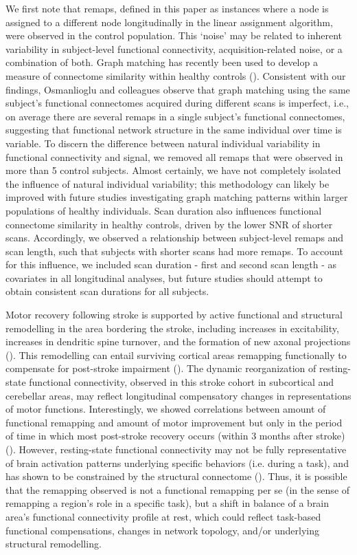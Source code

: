 \documentclass[phd,tocprelim]{cornell}
\begin{document}
	We first note that remaps, defined in this paper as instances where a node is assigned to a different node longitudinally in the linear assignment algorithm, were observed in the control population. This ‘noise’ may be related to inherent variability in subject-level functional connectivity, acquisition-related noise, or a combination of both. Graph matching has recently been used to develop a measure of connectome similarity within healthy controls (\cite{Osmanlioglu2020-xz}). Consistent with our findings, Osmanlioglu and colleagues observe that graph matching using the same subject’s functional connectomes acquired during different scans is imperfect, i.e., on average there are several remaps in a single subject’s functional connectomes, suggesting that functional network structure in the same individual over time is variable. To discern the difference between natural individual variability in functional connectivity and signal, we removed all remaps that were observed in more than 5 control subjects. Almost certainly, we have not completely isolated the influence of natural individual variability; this methodology can likely be improved with future studies investigating graph matching patterns within larger populations of healthy individuals. Scan duration also influences functional connectome similarity in healthy controls, driven by the lower SNR of shorter scans. Accordingly, we observed a relationship between subject-level remaps and scan length, such that subjects with shorter scans had more remaps. To account for this influence, we included scan duration - first and second scan length - as covariates in all longitudinal analyses, but future studies should attempt to obtain consistent scan durations for all subjects.
	
    Motor recovery following stroke is supported by active functional and structural remodelling in the area bordering the stroke, including increases in excitability, increases in dendritic spine turnover, and the formation of new axonal projections (\cite{Murphy2009-ez}). This remodelling can entail surviving cortical areas remapping functionally to compensate for post-stroke impairment (\cite{Brown2009-jn}). The dynamic reorganization of resting-state functional connectivity, observed in this stroke cohort in subcortical and cerebellar areas, may reflect longitudinal compensatory changes in representations of motor functions. Interestingly, we showed correlations between amount of functional remapping and amount of motor improvement but only in the period of time in which most post-stroke recovery occurs (within 3 months after stroke) (\cite{Lee2015-nn}). However, resting-state functional connectivity may not be fully representative of brain activation patterns underlying specific behaviors (i.e. during a task), and has shown to be constrained by the structural connectome (\cite{Kuceyeski2019-gt, Honey2009-xb}). Thus, it is possible that the remapping observed is not a functional remapping per se (in the sense of remapping a region's role in a specific task), but a shift in balance of a brain area's functional connectivity profile at rest, which could reflect task-based functional compensations, changes in network topology, and/or underlying structural remodelling. 
\end{document}
